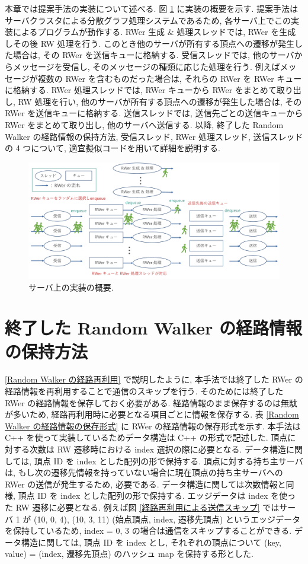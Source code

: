 本章では提案手法の実装について述べる. 図 \ref{サーバ上の実装の概要} に実装の概要を示す. 提案手法はサーバクラスタによる分散グラフ処理システムであるため, 各サーバ上でこの実装によるプログラムが動作する. RWer 生成 \& 処理スレッドでは, RWer を生成しその後 RW 処理を行う. このとき他のサーバが所有する頂点への遷移が発生した場合は, その RWer を送信キューに格納する. 受信スレッドでは, 他のサーバからメッセージを受信し, そのメッセージの種類に応じた処理を行う. 例えばメッセージが複数の RWer を含むものだった場合は, それらの RWer を RWer キューに格納する. RWer 処理スレッドでは, RWer キューから RWer をまとめて取り出し, RW 処理を行い, 他のサーバが所有する頂点への遷移が発生した場合は, その RWer を送信キューに格納する. 送信スレッドでは, 送信先ごとの送信キューから RWer をまとめて取り出し, 他のサーバへ送信する. 以降, 終了した Random Walker の経路情報の保持方法, 受信スレッド, RWer 処理スレッド, 送信スレッドの 4 つについて, 適宜擬似コードを用いて詳細を説明する. 

\begin{figure}[t]
    \centering
    \includegraphics[scale=0.5]{figure/implementation.pdf}
    \caption{サーバ上の実装の概要.}
    \label{サーバ上の実装の概要}
\end{figure}

\section{終了した Random Walker の経路情報の保持方法}

\ref{Random Walker の経路再利用} で説明したように, 本手法では終了した RWer の経路情報を再利用することで通信のスキップを行う. そのためには終了した RWer の経路情報を保存しておく必要がある. 経路情報のまま保存するのは無駄が多いため, 経路再利用時に必要となる項目ごとに情報を保存する. 表 \ref{Random Walker の経路情報の保存形式} に RWer の経路情報の保存形式を示す. 本手法は C++ を使って実装しているためデータ構造は C++ の形式で記述した. 頂点に対する次数は RW 遷移時における index 選択の際に必要となる. データ構造に関しては, 頂点 ID を index とした配列の形で保持する. 頂点に対する持ち主サーバは, もし次の遷移先情報を持っていない場合に現在頂点の持ち主サーバへの RWer の送信が発生するため, 必要である. データ構造に関しては次数情報と同様, 頂点 ID を index とした配列の形で保持する. エッジデータは index を使った RW 遷移に必要となる. 例えば図 \ref{経路再利用による送信スキップ} ではサーバ 1 が (10, 0, 4), (10, 3, 11) (始点頂点, index, 遷移先頂点) というエッジデータを保持しているため, index = 0, 3 の場合は通信をスキップすることができる. データ構造に関しては, 頂点 ID を index とし, それぞれの頂点について (key, value) = (index, 遷移先頂点) のハッシュ map を保持する形とした. 

